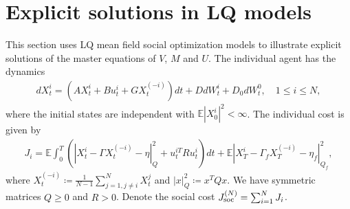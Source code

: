 \documentclass{amsart}
\theoremstyle{definition}
\theoremstyle{remark}
\def\EE{{\mathbb E}}
\numberwithin{equation}{section}
\begin{document}
\section{Explicit solutions in  LQ models}
\label{sec:lq}


This section uses  LQ mean field social optimization models
    to illustrate explicit solutions of the master equations of $V$, $M$ and $U$.
The individual agent has the dynamics
\begin{align}\label{xilq}
dX^i_t=(AX_t^i+Bu_t^i+G X_t^{(-i)}) dt
+D dW_t^i+D_0 dW_t^0,\quad 1\le i\le N,
\end{align}
where the initial states are independent with $\EE |X_0^i|^2<\infty$.
The individual  cost is given by
\begin{align}\label{jilq}
J_i=\EE\int_0^T
(|X_t^i-\Gamma X_t^{(-i)}-\eta|_Q^2
+u_t^{iT} R u_t^i) dt+\EE |X_T^i-\Gamma_f X_T^{(-i)}-\eta_f|_{Q_f}^2,
\end{align}
where $X_t^{(-i)}\coloneqq \frac{1}{N-1}\sum_{j=1, j\ne i}^N X_t^j$ and $|x|_Q^2 \coloneqq x^TQx$.
We have symmetric matrices $Q\ge 0$ and $R>0$.
Denote the social cost $J_{\rm soc}^{(N)}=\sum_{i=1}^N J_i$.
\end{document}
